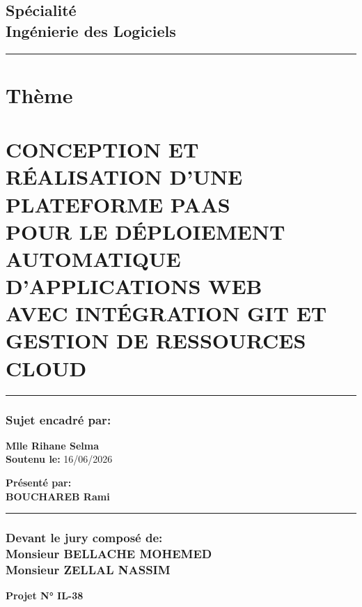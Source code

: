 \begin{titlepage}
\begin{center}
    \subsection*{\normalfont Spécialité \\ Ingénierie des Logiciels}
\vspace{-10pt}
 
\rule{17cm}{0.5pt} %

\vspace{-15pt}

\section*{Thème}
\vspace{-15pt}
\section*{\textbf{\small CONCEPTION ET RÉALISATION D'UNE PLATEFORME PAAS \\[-2pt]
POUR LE DÉPLOIEMENT AUTOMATIQUE D'APPLICATIONS WEB \\[-2pt]
AVEC INTÉGRATION GIT ET GESTION DE RESSOURCES CLOUD \\ [-2pt]}}
\vspace{-15pt}
\rule{17cm}{0.5pt} %
\end{center}

\vspace{-15pt}

\noindent
\begin{minipage}[t]{0.45\textwidth}
    \subsubsection*{Sujet encadré par:}
    \textbf{Mlle Rihane \normalfont Selma }\\
    \vspace{2cm}
    \textbf{Soutenu le:} 16/06/2026
\end{minipage}%
\hfill
\begin{minipage}[t]{0.45\textwidth}
    \flushright
    \textbf{Présenté par:} \\
    \textbf{BOUCHAREB \normalfont Rami}\\
\end{minipage}

\vspace{-45pt}

\rule{16.5cm}{0.5pt} %

\vspace{-20pt}

\subsubsection*{\textbf{Devant le jury composé de:}\\
\textbf{Monsieur BELLACHE \normalfont MOHEMED}\\
\textbf{Monsieur ZELLAL \normalfont NASSIM}}


\centering
\textbf{Projet N° IL-38}

\end{titlepage}
